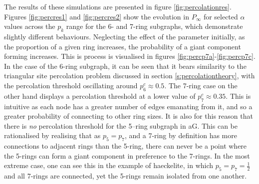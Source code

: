 The results of these simulations are presented in figure \ref{fig:percolationres}.
Figures \ref{fig:percres1} and \ref{fig:percres2} show the evolution in $P_\infty$ for selected $\alpha$ values across the $p_k$ range for the 6\-- and 7\--ring subgraphs, which demonstrate slightly different behaviours.
Neglecting the effect of the \aw{} parameter initially, as the proportion of a given ring increases, the probability of a giant component forming increases.
This is process is visualised in figures \ref{fig:percp7a}\--\ref{fig:percp7c}.
In the case of the 6\--ring subgraph, it can be seen that it bears similarity to the triangular site percolation problem discussed in section \ref{s:percolationtheory}, with the percolation threshold oscillating around $p_6^c\approx0.5$.
The 7\--ring case on the other hand displays a percolation threshold at a lower value of $p_7^c\approx0.35$.
This is intuitive as each node has a greater number of edges emanating from it, and so a greater probability of connecting to other ring sizes.
It is also for this reason that there is \textit{no} percolation threshold for the 5--ring subgraph in aG.
This can be rationalised by realising that as $p_5=p_7$, and a 7\--ring by definition has more connections to adjacent rings than the 5\--ring, there can never be a point where the 5\--rings can form a giant component in preference to the 7\--rings.
In the most extreme case, one can see this in the example of haeckelite, in which $p_5=p_7=\frac{1}{2}$ and all 7\--rings are connected, yet the 5\--rings remain isolated from one another.


